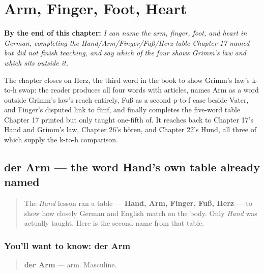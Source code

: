 
\chapter{Arm, Finger, Foot, Heart}
\label{ch:ge-hand-table-complete}

\begin{chapteropening}
\textbf{By the end of this chapter:} \emph{I can name the arm, finger, foot, and heart in German, completing the Hand/Arm/Finger/Fuß/Herz table Chapter 17 named but did not finish teaching, and say which of the four shows Grimm's law and which sits outside it.}

The chapter closes on Herz, the third word in the book to show Grimm's law's k-to-h swap: the reader produces all four words with articles, names Arm as a word outside Grimm's law's reach entirely, Fuß as a second p-to-f case beside Vater, and Finger's disputed link to fünf, and finally completes the five-word table Chapter 17 printed but only taught one-fifth of. It reaches back to Chapter 17's Hand and Grimm's law, Chapter 26's hören, and Chapter 22's Hund, all three of which supply the k-to-h comparison.
\end{chapteropening}

\section[der Arm]{der Arm — the word Hand's own table already named}

\label{lesson:GE-C31-arm}



\begin{quote}
The \emph{Hand} lesson ran a table — \textbf{Hand, Arm, Finger, Fuß, Herz} — to show how closely German and English match on the body. Only \emph{Hand} was actually taught. Here is the second name from that table.
\end{quote}

\subsection*{You'll want to know: der Arm}
\begin{quote}
\textbf{der Arm} — arm. Masculine.
\end{quote}

